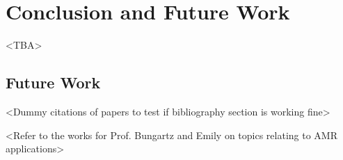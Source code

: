 \chapter{Conclusion and Future Work}\label{chapter:conclusion and future}
<TBA>
\section{Future Work}
<Dummy citations of papers to test if bibliography section is working fine>
\cite{felix}
\cite{laxmikant}
\cite{nikolas}
\cite{rudolph}
\cite{isaias}
\cite{andreas}
\cite{georgiou}
\cite{travis}
\cite{gladys}
\cite{klein}
\cite{pavan}
\cite{jette}
\cite{abhishek}
\cite{david}
\cite{joseph}
\cite{hungershofer}
\cite{yangjie}
\cite{zhou}
\cite{lucero}
\cite{desai}
\cite{yang}
\cite{daniel}
\cite{dror}
\cite{ahuva}
\cite{dinesh}
\cite{slurm}
\cite{tsafrir}
\cite{streit}
\cite{achim}
\cite{achim1}
\cite{streit1}
\cite{achim2}
\cite{striet2}
\cite{deshmeh}
\cite{tiachao}
\cite{oliver}
\cite{alain}
\cite{viktor}
\cite{rizos}
\cite{viktor1}
\cite{javier}
\cite{kwang}
\cite{kurowski}
\cite{ariel}
\cite{roland}
\cite{cirne}
\cite{desai}
\cite{michal}
\cite{sudha}
\cite{srividya}
\cite{song}
\cite{sabin}
\cite{dalibor}
\cite{osman}
\cite{rajesh}
\cite{calvin}
\cite{sudarshan}
\cite{ribbens}
\cite{vadhiyar}
\cite{gonzalo}
\cite{martin}
\cite{gonzalo1}
\cite{maria}
\cite{srinidhi}
\cite{jamjoom}
\cite{zhiling}
\cite{siham}
\cite{deshmeh2010adept}
\cite{wcirne}
\cite{wcirne1}
\cite{daniel1}
\cite{da2015exascale}
\cite{dongxu}
\cite{buisson}
\cite{striet2}
\cite{schulz}
\cite{wong}
\cite{teich}

<Refer to the works for Prof. Bungartz and Emily on topics relating to AMR applications>
